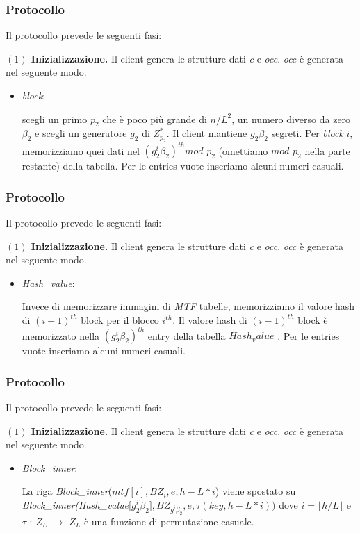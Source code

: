 \documentclass{beamer}
\begin{document}
\begin{frame}
\frametitle{Protocollo}
Il protocollo prevede le seguenti fasi:

\textbf{$(1)$ Inizializzazione.} Il client genera le strutture dati \textit{c} e \textit{occ}. \textit{occ} è generata nel seguente modo.

\begin{itemize}
\item \textit{block}:

scegli un primo $ p_{2} $ che è poco più grande di $n/L^{2}$,
un numero diverso da zero $ \beta_{2} $ e scegli un generatore $g_{2}$ di $ Z^{*}_{p_{2}} $.
Il client mantiene $ g_{2} \beta_{2} $ segreti. Per \textit{block} $ i $, memorizziamo quei dati nel $ (g^{i}_{2}\beta_{2})^{th} mod$ $p_{2}$
(omettiamo $mod$ $ p_{2}$ nella parte restante) della tabella.
Per le entries vuote inseriamo alcuni numeri casuali.
\end{itemize}
\end{frame}
\begin{frame}
\frametitle{Protocollo}
Il protocollo prevede le seguenti fasi:

\textbf{$(1)$ Inizializzazione.} Il client genera le strutture dati \textit{c} e \textit{occ}. \textit{occ} è generata nel seguente modo.

\begin{itemize}
\item \textit{Hash\_value}:

Invece di memorizzare immagini di \textit{MTF}
tabelle, memorizziamo il valore hash di $ (i-1)^{th} $ block
per il blocco $ i^{th} $. Il valore hash di $ (i-1)^{th} $ block
è memorizzato nella $ (g^{i}_{2}\beta_{2})^{th}$ entry della tabella $Hash_value$ .
Per le entries vuote inseriamo alcuni numeri casuali.
\end{itemize}
\end{frame}
\begin{frame}
\frametitle{Protocollo}
Il protocollo prevede le seguenti fasi:

\textbf{$(1)$ Inizializzazione.} Il client genera le strutture dati \textit{c} e \textit{occ}. \textit{occ} è generata nel seguente modo.

\begin{itemize}
\item \textit{Block\_inner}:


La riga \textit{Block\_inner}($mtf[i],BZ_{i}, e, h-L*i$) viene spostato su \textit{Block\_inner}\textit{(Hash\_value}[$g^{i}_{2}\beta_{2}], BZ_{g^{i}{\beta_{2}}}, e, \tau(key, h-L*i))$
dove $i = \lfloor h/L\rfloor$ e $\tau$ : $Z_{L} $ $\rightarrow$ $Z_{L} $ è una funzione di permutazione casuale.
\end{itemize}
\end{frame}
\end{document}
